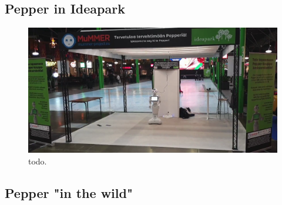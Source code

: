 \subsection{Pepper in Ideapark}

\begin{figure}[ht!]
\centering
\includegraphics[scale=0.15]{figures/chapter8/pepper_mall.png}
\caption{\label{fig:chap8_pepper_mall} todo. }
\end{figure}

\subsection{Pepper "in the wild"}